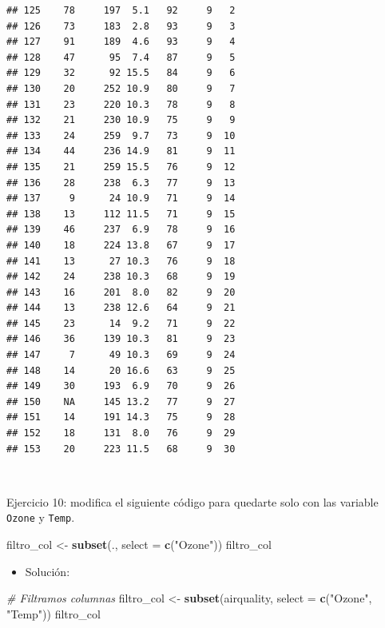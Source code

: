 \documentclass[11pt,]{book}
\newenvironment{Shaded}{\begin{snugshade}}{\end{snugshade}}
\newcommand{\CommentTok}[1]{\textcolor[rgb]{0.37,0.37,0.37}{\textit{#1}}}
\newcommand{\DataTypeTok}[1]{\textcolor[rgb]{0.27,0.27,0.27}{#1}}
\newcommand{\KeywordTok}[1]{\textcolor[rgb]{0.27,0.27,0.27}{\textbf{#1}}}
\newcommand{\NormalTok}[1]{#1}
\newcommand{\StringTok}[1]{\textcolor[rgb]{0.5,0.5,0.5}{#1}}
\providecommand{\tightlist}{%
  \setlength{\itemsep}{0pt}\setlength{\parskip}{0pt}}
\begin{document}
\begin{verbatim}
## 125    78     197  5.1   92     9   2
## 126    73     183  2.8   93     9   3
## 127    91     189  4.6   93     9   4
## 128    47      95  7.4   87     9   5
## 129    32      92 15.5   84     9   6
## 130    20     252 10.9   80     9   7
## 131    23     220 10.3   78     9   8
## 132    21     230 10.9   75     9   9
## 133    24     259  9.7   73     9  10
## 134    44     236 14.9   81     9  11
## 135    21     259 15.5   76     9  12
## 136    28     238  6.3   77     9  13
## 137     9      24 10.9   71     9  14
## 138    13     112 11.5   71     9  15
## 139    46     237  6.9   78     9  16
## 140    18     224 13.8   67     9  17
## 141    13      27 10.3   76     9  18
## 142    24     238 10.3   68     9  19
## 143    16     201  8.0   82     9  20
## 144    13     238 12.6   64     9  21
## 145    23      14  9.2   71     9  22
## 146    36     139 10.3   81     9  23
## 147     7      49 10.3   69     9  24
## 148    14      20 16.6   63     9  25
## 149    30     193  6.9   70     9  26
## 150    NA     145 13.2   77     9  27
## 151    14     191 14.3   75     9  28
## 152    18     131  8.0   76     9  29
## 153    20     223 11.5   68     9  30
\end{verbatim}

~

Ejercicio 10: modifica el siguiente código para quedarte solo con las variable \texttt{Ozone} y \texttt{Temp}.

\begin{Shaded}
\begin{Highlighting}[]
\NormalTok{filtro_col <-}\StringTok{ }\KeywordTok{subset}\NormalTok{(.,  }\DataTypeTok{select =} \KeywordTok{c}\NormalTok{(}\StringTok{"Ozone"}\NormalTok{))}
\NormalTok{filtro_col}
\end{Highlighting}
\end{Shaded}

\begin{itemize}
\tightlist
\item
  Solución:
\end{itemize}

\begin{Shaded}
\begin{Highlighting}[]
\CommentTok{# Filtramos columnas}
\NormalTok{filtro_col <-}\StringTok{ }\KeywordTok{subset}\NormalTok{(airquality,  }\DataTypeTok{select =} \KeywordTok{c}\NormalTok{(}\StringTok{"Ozone"}\NormalTok{, }\StringTok{"Temp"}\NormalTok{))}
\NormalTok{filtro_col}
\end{Highlighting}
\end{Shaded}
\end{document}
